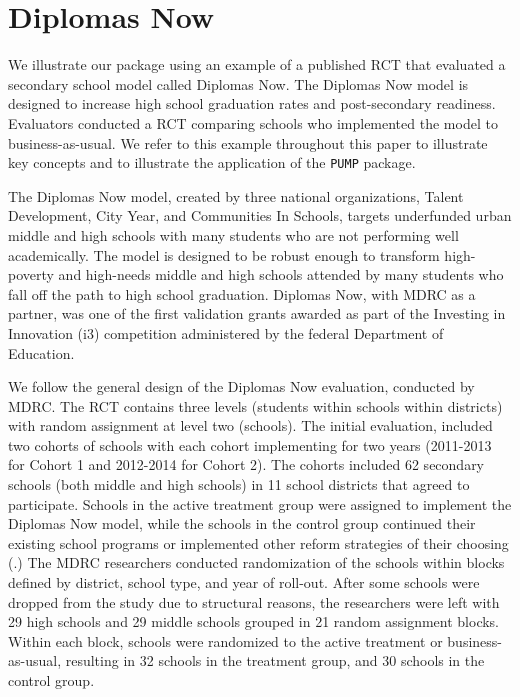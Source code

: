 \documentclass[
]{jss}
\begin{document}
\section{Diplomas Now}
\label{sec:diplomas}

We illustrate our package using an example of a published RCT that
evaluated a secondary school model called Diplomas Now. The Diplomas Now
model is designed to increase high school graduation rates and
post-secondary readiness. Evaluators conducted a RCT comparing schools
who implemented the model to business-as-usual. We refer to this example
throughout this paper to illustrate key concepts and to illustrate the
application of the \texttt{PUMP} package.

The Diplomas Now model, created by three national organizations, Talent
Development, City Year, and Communities In Schools, targets underfunded
urban middle and high schools with many students who are not performing
well academically. The model is designed to be robust enough to
transform high-poverty and high-needs middle and high schools attended
by many students who fall off the path to high school graduation.
Diplomas Now, with MDRC as a partner, was one of the first validation
grants awarded as part of the Investing in Innovation (i3) competition
administered by the federal Department of Education.

We follow the general design of the Diplomas Now evaluation, conducted
by MDRC. The RCT contains three levels (students within schools within
districts) with random assignment at level two (schools). The initial
evaluation, included two cohorts of schools with each cohort
implementing for two years (2011-2013 for Cohort 1 and 2012-2014 for
Cohort 2). The cohorts included 62 secondary schools (both middle and
high schools) in 11 school districts that agreed to participate. Schools
in the active treatment group were assigned to implement the Diplomas
Now model, while the schools in the control group continued their
existing school programs or implemented other reform strategies of their
choosing (\citet{DNREPORT}.) The MDRC researchers conducted
randomization of the schools within blocks defined by district, school
type, and year of roll-out. After some schools were dropped from the
study due to structural reasons, the researchers were left with 29 high
schools and 29 middle schools grouped in 21 random assignment blocks.
Within each block, schools were randomized to the active treatment or
business-as-usual, resulting in 32 schools in the treatment group, and
30 schools in the control group.
\end{document}
